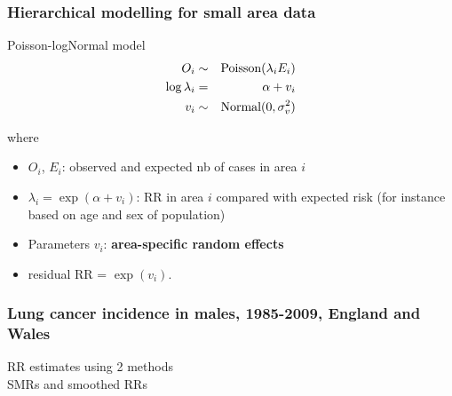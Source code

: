 \documentclass[slidestop,compress,serif,10pt]{beamer}
\begin{document}
\begin{frame}
    \frametitle{Hierarchical modelling for small area data}
\begin{block}{Poisson-logNormal model}
\vspace{-0.5cm}
\begin{eqnarray*}
O_i & \sim & \hbox{Poisson}(\lambda_i E_i) \\
\log \lambda_i & = & \alpha + v_i\\
v_i & \sim  & \hbox{Normal}(0, \sigma_v^2)
\end{eqnarray*}

\end{block}
where
\begin{itemize}
  \item $O_i$, $E_i$: observed and expected nb of cases in area $i$
  \item $\lambda_i=\exp (\alpha +  v_i)$: RR in area $i$ compared with expected risk (for instance based on age and sex of population)
  \item Parameters $v_i$: {\bf area-specific random effects}
  \item residual RR = $\exp (v_i)$.
\end{itemize}
\end{frame}
\begin{frame}
    \frametitle{Lung cancer incidence in males, 1985-2009, England and Wales}
    \begin{center}
    RR estimates using 2 methods
        \\
        SMRs and smoothed RRs
    \end{center}
\end{frame}
\end{document}
